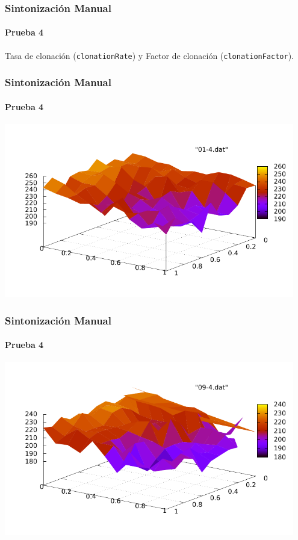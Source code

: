 \frame
{
\frametitle{Sintonización Manual}
\framesubtitle{Prueba 4}

\vspace{1cm}
\begin{center}
    Tasa de clonación (\texttt{clonationRate}) y Factor de clonación (\texttt{clonationFactor}).
\end{center}
}
\frame
{
\frametitle{Sintonización Manual}
\framesubtitle{Prueba 4}

\begin{center}
    \includegraphics[width=0.95\textwidth]{../doc/img/01-4.pdf}
\end{center}
}

\frame
{
\frametitle{Sintonización Manual}
\framesubtitle{Prueba 4}

\begin{center}
    \includegraphics[width=0.95\textwidth]{../doc/img/09-4.pdf}
\end{center}
}

